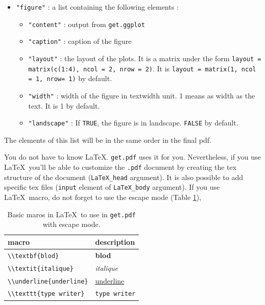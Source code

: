 \documentclass{article}\usepackage[]{graphicx}\usepackage[]{color}
\begin{document}
\begin{itemize}
\item \texttt{"figure"} : a list containing the following elements :
	\begin{itemize}
	\item \texttt{"content"} : output from \texttt{get.ggplot}
	\item \texttt{"caption"} : caption of the figure
	\item \texttt{"layout"} : the layout of the plots. It is a matrix under the form \texttt{layout = matrix(c(1:4), ncol = 2, nrow = 2)}. It is \texttt{layout = matrix(1, ncol = 1, nrow= 1)} by default.
	\item \texttt{"width"} : width of the figure in textwidth unit. 1 means as width as the text. It is 1 by default.
	\item \texttt{"landscape"} : If \texttt{TRUE}, the figure is in landscape. \texttt{FALSE} by default.
	\end{itemize}

\end{itemize}


The elements of this list will be in the same order in the final pdf.

You do not have to know \LaTeX. \texttt{get.pdf} uses it for you.
Nevertheless, if you use \LaTeX~you'll be able to customize the \texttt{.pdf} document by creating the tex structure of the document (\texttt{LaTeX\_head} argument).
It is also possible to add specific tex files (\texttt{input} element of \texttt{LaTeX\_body} argument).
If you use \LaTeX~macro, do not forget to use the escape mode (Table \ref{macros}),

\begin{table}[H]
\begin{center}
\begin{tabular}{ll}
\hline
macro & description \\
\hline
\verb|\\textbf{blod}| & \textbf{blod} \\
\hline
\verb|\\textit{italique}| & \textit{italique} \\
\hline
\verb|\\underline{underline}| & \underline{underline} \\
\hline
\verb|\\texttt{type writer}| & \texttt{type writer} \\
\hline
\end{tabular}
\caption{Basic maros in \LaTeX~to use in \texttt{get.pdf} with escape mode.}
\label{macros}
\end{center}
\end{table}
\end{document}
